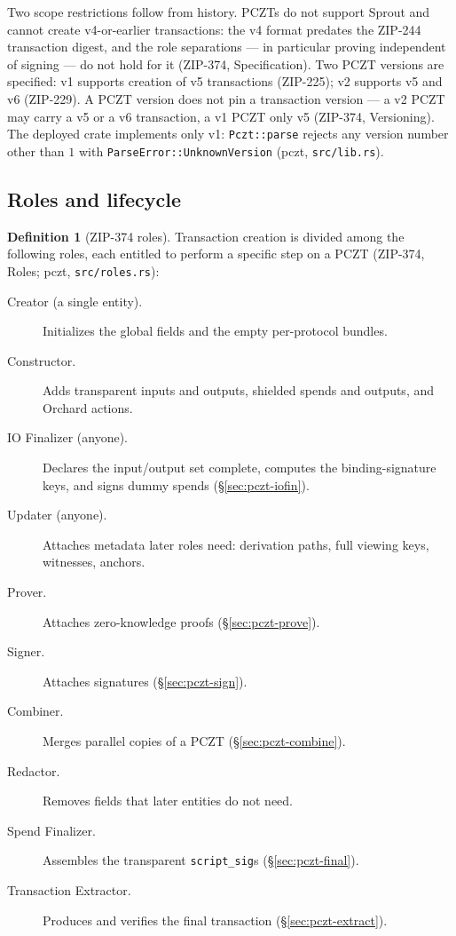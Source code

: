 \documentclass[11pt,a4paper]{article}
\theoremstyle{definition}
\newtheorem{definition}[theorem]{Definition}
\begin{document}
Two scope restrictions follow from history. PCZTs do not support Sprout
and cannot create v4-or-earlier transactions: the v4 format predates the
ZIP-244 transaction digest, and the role separations --- in particular
proving independent of signing --- do not hold for it (ZIP-374,
Specification). Two PCZT versions are specified: v1 supports creation of
v5 transactions (ZIP-225); v2 supports v5 and v6 (ZIP-229). A PCZT version
does not pin a transaction version --- a v2 PCZT may carry a v5 or a v6
transaction, a v1 PCZT only v5 (ZIP-374, Versioning). The deployed crate
implements only v1: \texttt{Pczt::parse} rejects any version number other
than $1$ with \texttt{ParseError::UnknownVersion} (\textsf{pczt},
\texttt{src/lib.rs}).

\subsection{Roles and lifecycle}\label{sec:pczt-roles}

\begin{definition}[ZIP-374 roles]\label{def:pczt-roles}
Transaction creation is divided among the following roles, each entitled
to perform a specific step on a PCZT (ZIP-374, Roles; \textsf{pczt},
\texttt{src/roles.rs}):
\begin{description}
\item[Creator (a single entity).] Initializes the global fields and the
  empty per-protocol bundles.
\item[Constructor.] Adds transparent inputs and outputs, shielded spends
  and outputs, and Orchard actions.
\item[IO Finalizer (anyone).] Declares the input/output set complete,
  computes the binding-signature keys, and signs dummy spends
  (\S\ref{sec:pczt-iofin}).
\item[Updater (anyone).] Attaches metadata later roles need: derivation
  paths, full viewing keys, witnesses, anchors.
\item[Prover.] Attaches zero-knowledge proofs (\S\ref{sec:pczt-prove}).
\item[Signer.] Attaches signatures (\S\ref{sec:pczt-sign}).
\item[Combiner.] Merges parallel copies of a PCZT
  (\S\ref{sec:pczt-combine}).
\item[Redactor.] Removes fields that later entities do not need.
\item[Spend Finalizer.] Assembles the transparent
  \texttt{script\_sig}s (\S\ref{sec:pczt-final}).
\item[Transaction Extractor.] Produces and verifies the final transaction
  (\S\ref{sec:pczt-extract}).
\end{description}
\end{definition}
\end{document}
